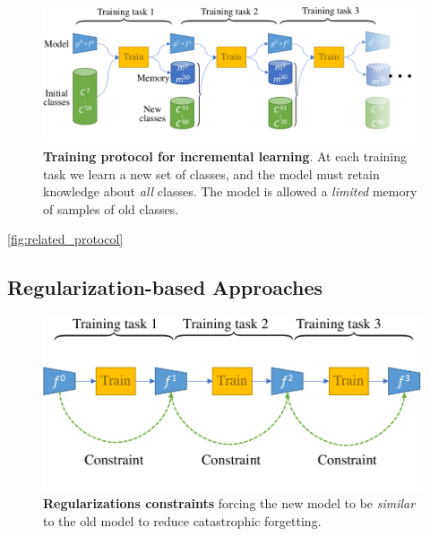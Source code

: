\begin{figure}[tb]
      \begin{center}
            \includegraphics[width=1.0\linewidth]{images/podnet/protocol}
      \end{center}
      \caption{\textbf{Training protocol for incremental learning}. At each training task we learn a
            new set of classes, and the model must retain knowledge about \textit{all} classes. The
            model is allowed a \textit{limited} memory of samples of old classes.}
      \label{fig:related_protocol}
\end{figure}

\autoref{fig:related_protocol}


\subsection{Regularization-based Approaches}
\label{sec:related_regul}


\begin{figure}[tb]
      \begin{center}
            \includegraphics[width=1.0\linewidth]{images/related/continual_regularizations.pdf}
      \end{center}
      \caption{\textbf{Regularizations constraints} forcing the new model to be \textit{similar} to
            the old model to reduce catastrophic forgetting.}
      \label{fig:related_regul}
\end{figure}

